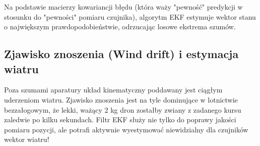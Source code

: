 Na podstawie macierzy kowariancji błędu (która waży "pewność" predykcji w stosunku do "pewności" pomiaru czujnika), algorytm EKF estymuje wektor stanu o największym prawdopodobieństwie, odrzucając losowe ekstrema szumów.

\subsection{Zjawisko znoszenia (Wind drift) i estymacja wiatru}

Poza szumami aparatury układ kinematyczny poddawany jest ciągłym uderzeniom wiatru. Zjawisko znoszenia jest na tyle dominujące w lotnictwie bezzałogowym, że lekki, ważący 2 kg dron zostałby zwiany z zadanego kursu zaledwie po kilku sekundach. Filtr EKF służy nie tylko do poprawy jakości pomiaru pozycji, ale potrafi aktywnie wyestymować niewidzialny dla czujników wektor wiatru!

